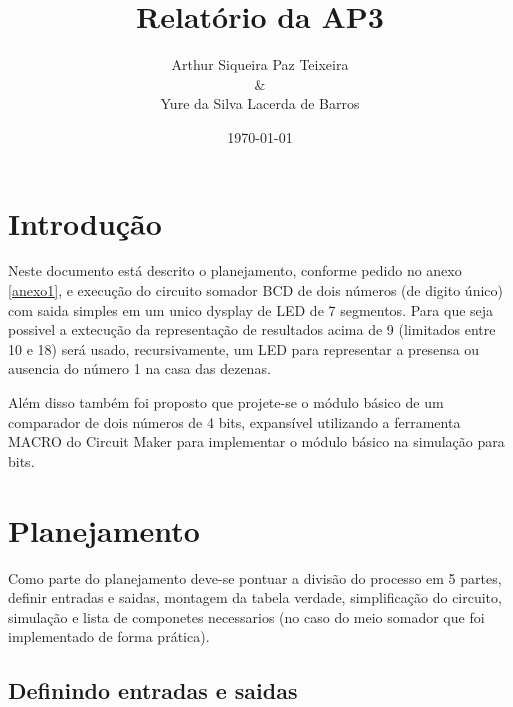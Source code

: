 \documentclass[11pt]{report}         %
\title{\textbf{Relatório da AP3}}
\author{Arthur Siqueira Paz Teixeira \\ \& \\ Yure da Silva Lacerda de Barros}
\affil{Disciplina: Circuitos Lógicos -- Professor: Fabio Marujo}
\date{\today}
\begin{document}

\maketitle                        %
\tableofcontents                  %

\chapter {Introdução}             %

Neste documento está descrito o planejamento, conforme pedido no anexo \ref{anexo1}, e execução do circuito somador BCD de dois números (de digito único) 
com saida simples em um unico dysplay de LED de 7 segmentos. Para que seja possivel a extecução da representação de resultados acima de 9 
(limitados entre 10 e 18) será usado, recursivamente, um LED para representar a presensa ou ausencia do número 1 na casa das dezenas.

Além disso também foi proposto que projete-se o módulo básico de um comparador de dois números de 4 bits, expansível utilizando a ferramenta MACRO do 
Circuit Maker para implementar o módulo básico na simulação para bits.


\chapter {Planejamento}

Como parte do planejamento deve-se pontuar a divisão do processo em 5 partes, definir entradas e saidas, montagem da tabela verdade, simplificação do
circuito, simulação e lista de componetes necessarios (no caso do meio somador que foi implementado de forma prática).

\section {Definindo entradas e saidas}
\end{document}
